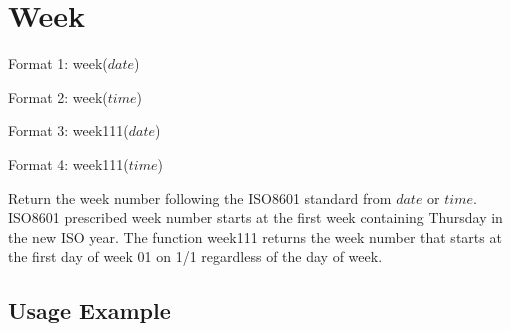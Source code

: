 %

\section{Week \label{sect:week}}

Format 1: week($date$)

Format 2: week($time$)

Format 3: week111($date$)

Format 4: week111($time$)

Return the week number following the ISO8601 standard from $date$ or $time$. ISO8601 prescribed week number starts at the first week containing Thursday in the new ISO year. The function week111 returns the week number that starts at the first day of week 01 on 1/1 regardless of the day of week.  

\subsection*{Usage Example}


%


